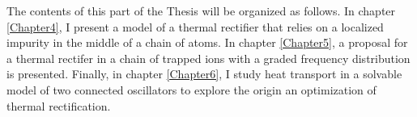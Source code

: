 The contents of this part of the Thesis will be organized as follows. In chapter \ref{Chapter4}, I present a model of a thermal rectifier that relies on a localized impurity in the middle of a chain of atoms. In chapter \ref{Chapter5}, a proposal for a thermal rectifer in a chain of trapped ions with a graded frequency distribution is presented. Finally, in chapter \ref{Chapter6}, I study heat transport in a solvable model of two connected oscillators to explore the origin an optimization of thermal rectification.
